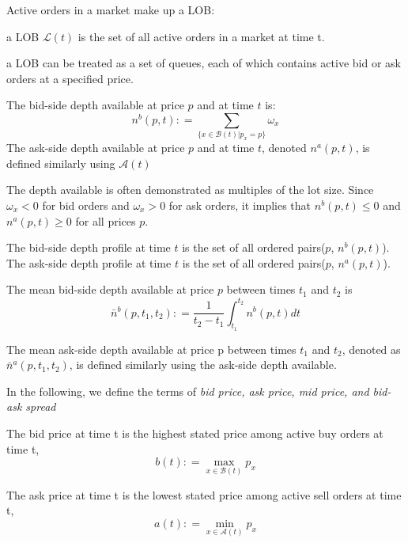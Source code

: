 Active orders in a market make up a LOB: 
\begin{defn}\cite{gould2013limit}
a LOB $\mathcal{L}(t)$ is the set of all active orders in a market at time t.
\end{defn} 

a LOB can be treated as a set of queues,  each of which contains active bid or ask orders at a specified price.
\begin{defn}\cite{gould2013limit}
The bid-side depth available at price $p$ and at time $t$ is: 
\begin{equation*}
n^b(p, t): =\sum_{\{x \in \mathcal{B}(t)|p_x=p\}}\omega_x
\end{equation*}
The ask-side depth available at price $p$ and at time $t$,  denoted $n^a(p, t)$,  is defined similarly using $\mathcal{A}(t)$
\end{defn} 

The depth available is often demonstrated as multiples of the lot size. Since $\omega_x<0$ for bid orders and $\omega_x>0$ for ask orders,  it implies that $n^b(p, t)\leq 0$ and $n^a(p, t)\geq 0$ for all prices $p$.
\begin{defn}\cite{gould2013limit}
The bid-side depth profile at time $t$ is the set of all ordered pairs($p$, $n^b(p, t)$). The ask-side depth profile at time $t$ is the set of all ordered pairs($p$, $n^a(p, t)$).
\end{defn}

\begin{defn}\cite{gould2013limit}
The mean bid-side depth available at price $p$ between times $t_1$ and $t_2$ is
\begin{equation*}
\bar{n}^b(p, t_1, t_2): =\frac{1}{t_2-t_1}\int_{t_1}^{t_2}n^b(p, t)dt
\end{equation*}

The mean ask-side depth available at price p between times $t_1$ and $t_2$,  denoted as $\bar{n}^a(p, t_1, t_2)$,  is defined similarly using the ask-side depth available.
\end{defn}

In the following,  we define the terms of \textit{bid price,  ask price,  mid price,  and bid-ask spread}
\begin{defn}\cite{gould2013limit}
The bid price at time t is the highest stated price among active buy orders at time t, 
\begin{equation*}
b(t): =\max_{x\in \mathcal{B}(t)}p_x
\end{equation*}

The ask price at time t is the lowest stated price among active sell orders at time t, 
\begin{equation*}
a(t): =\min_{x\in \mathcal{A}(t)}p_x
\end{equation*}
\end{defn}

